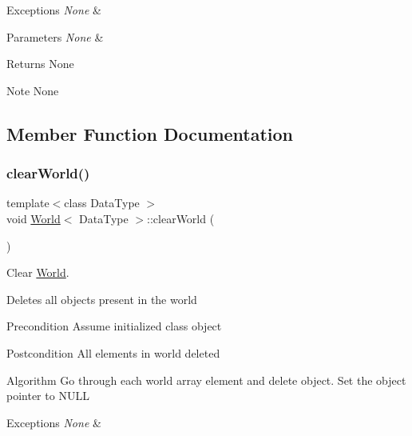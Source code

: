 \begin{DoxyExceptions}{Exceptions}
{\em None} & \\
\hline
\end{DoxyExceptions}

\begin{DoxyParams}{Parameters}
{\em None} & \\
\hline
\end{DoxyParams}
\begin{DoxyReturn}{Returns}
None
\end{DoxyReturn}
\begin{DoxyNote}{Note}
None 
\end{DoxyNote}


\subsection{Member Function Documentation}
\hypertarget{class_world_af31bc0ee4c2303eabd84765deff08a8a}{}\label{class_world_af31bc0ee4c2303eabd84765deff08a8a} 
\subsubsection{\texorpdfstring{clear\+World()}{clearWorld()}}
{\footnotesize\ttfamily template$<$class Data\+Type $>$ \\
void \hyperlink{class_world}{World}$<$ Data\+Type $>$\+::clear\+World (\begin{DoxyParamCaption}{ }\end{DoxyParamCaption})}



Clear \hyperlink{class_world}{World}. 

Deletes all objects present in the world

\begin{DoxyPrecond}{Precondition}
Assume initialized class object
\end{DoxyPrecond}
\begin{DoxyPostcond}{Postcondition}
All elements in world deleted
\end{DoxyPostcond}
\begin{DoxyParagraph}{Algorithm}
Go through each world array element and delete object. Set the object pointer to N\+U\+LL
\end{DoxyParagraph}

\begin{DoxyExceptions}{Exceptions}
{\em None} & \\
\hline
\end{DoxyExceptions}

